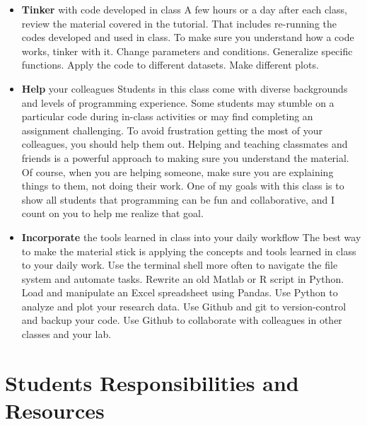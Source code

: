 \documentclass[11pt]{article}
\begin{document}
\begin{itemize}
	
	\item \textbf{Tinker} with code developed in class
		\subitem A few hours or a day after each class, review the material covered in the tutorial. That includes re-running the codes developed and used in class. To make sure you understand how a code works, tinker with it. Change parameters and conditions. Generalize specific functions. Apply the code to different datasets. Make different plots.
	\item \textbf{Help} your colleagues
	\subitem  Students in this class come with diverse backgrounds and levels of programming experience. Some students may stumble on a particular code during in-class activities or may find completing an assignment challenging.  To avoid frustration getting the most of your colleagues, you should help them out. Helping and teaching classmates and friends is a powerful approach to making sure you understand the material. Of course, when you are helping someone, make sure you are explaining things to them, not doing their work.
	One of my goals with this class is to show all students that programming can be fun and collaborative, and I count on you to help me realize that goal. 
	\item \textbf{Incorporate} the tools learned in class into your daily workflow
	\subitem The best way to make the material stick is applying the concepts and tools learned in class to your daily work. Use the terminal shell more often to navigate the file system and automate tasks. Rewrite an old Matlab or R script in Python. Load and manipulate an Excel spreadsheet using Pandas. Use Python to analyze and plot your research data. Use Github and git to version-control and backup your code. Use Github to collaborate with colleagues in other classes and your lab.

\end{itemize}

\section*{Students Responsibilities and Resources}
\end{document}
